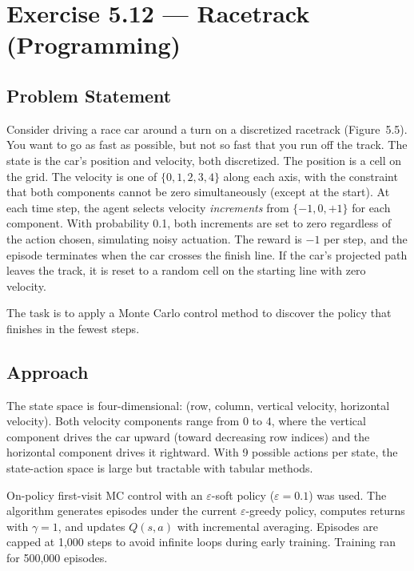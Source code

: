 \documentclass[11pt]{article}
\begin{document}
\newpage
\section*{Exercise 5.12 --- Racetrack (Programming)}

\subsection*{Problem Statement}

Consider driving a race car around a turn on a discretized racetrack (Figure~5.5). You want to go as fast as possible, but not so fast that you run off the track. The state is the car's position and velocity, both discretized. The position is a cell on the grid. The velocity is one of $\{0, 1, 2, 3, 4\}$ along each axis, with the constraint that both components cannot be zero simultaneously (except at the start). At each time step, the agent selects velocity \textit{increments} from $\{-1, 0, +1\}$ for each component. With probability 0.1, both increments are set to zero regardless of the action chosen, simulating noisy actuation. The reward is $-1$ per step, and the episode terminates when the car crosses the finish line. If the car's projected path leaves the track, it is reset to a random cell on the starting line with zero velocity.

The task is to apply a Monte Carlo control method to discover the policy that finishes in the fewest steps.

\subsection*{Approach}

The state space is four-dimensional: (row, column, vertical velocity, horizontal velocity). Both velocity components range from $0$ to $4$, where the vertical component drives the car upward (toward decreasing row indices) and the horizontal component drives it rightward. With 9 possible actions per state, the state-action space is large but tractable with tabular methods.

On-policy first-visit MC control with an $\varepsilon$-soft policy ($\varepsilon = 0.1$) was used. The algorithm generates episodes under the current $\varepsilon$-greedy policy, computes returns with $\gamma = 1$, and updates $Q(s,a)$ with incremental averaging. Episodes are capped at 1{,}000 steps to avoid infinite loops during early training. Training ran for 500{,}000 episodes.
\end{document}
